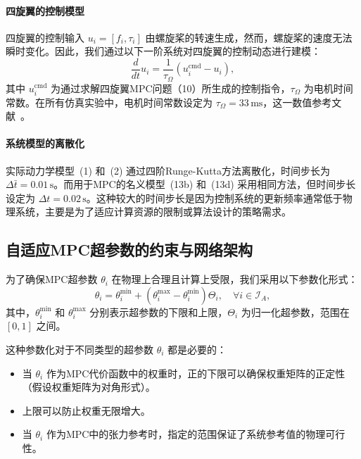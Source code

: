 \documentclass[lang=chs, degree=master, blindreview=false, winfonts=true]{yanputhesis}
\begin{document}
\paragraph{四旋翼的控制模型} 四旋翼的控制输入 \( u_i = [f_i, \tau_i] \) 由螺旋桨的转速生成，然而，螺旋桨的速度无法瞬时变化。因此，我们通过以下一阶系统对四旋翼的控制动态进行建模：
\begin{equation}
    \frac{d}{dt} u_i = \frac{1}{\tau_\Omega} \left( u_i^\text{cmd} - u_i \right),
\end{equation}
其中 \( u_i^\text{cmd} \) 为通过求解四旋翼MPC问题（10）所生成的控制指令，\( \tau_\Omega \) 为电机时间常数。在所有仿真实验中，电机时间常数设定为 \( \tau_\Omega = 33 \, \text{ms} \)，这一数值参考文献~\cite{ref41}。

\paragraph{系统模型的离散化} 实际动力学模型~(1) 和~(2) 通过四阶Runge-Kutta方法离散化，时间步长为 \( \Delta \bar{t} = 0.01 \, \text{s} \)。而用于MPC的名义模型~(13b) 和~(13d) 采用相同方法，但时间步长设定为 \( \Delta t = 0.02 \, \text{s} \)。这种较大的时间步长是因为控制系统的更新频率通常低于物理系统，主要是为了适应计算资源的限制或算法设计的策略需求。

\subsection{自适应MPC超参数的约束与网络架构}

为了确保MPC超参数 \( \theta_i \) 在物理上合理且计算上受限，我们采用以下参数化形式：
\begin{equation}
    \theta_i = \theta_i^\text{min} + \left( \theta_i^\text{max} - \theta_i^\text{min} \right) \Theta_i, \quad \forall i \in \mathcal{I}_A,
\end{equation}
其中，\( \theta_i^\text{min} \) 和 \( \theta_i^\text{max} \) 分别表示超参数的下限和上限，\( \Theta_i \) 为归一化超参数，范围在 \([0, 1]\) 之间。

这种参数化对于不同类型的超参数 \( \theta_i \) 都是必要的：
\begin{itemize}
    \item 当 \( \theta_i \) 作为MPC代价函数中的权重时，正的下限可以确保权重矩阵的正定性（假设权重矩阵为对角形式）。
    \item 上限可以防止权重无限增大。
    \item 当 \( \theta_i \) 作为MPC中的张力参考时，指定的范围保证了系统参考值的物理可行性。
\end{itemize}
\end{document}

